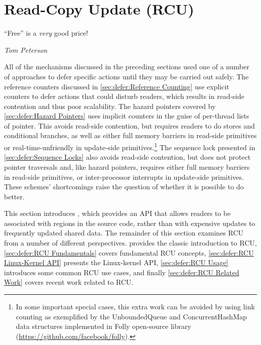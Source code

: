 
\section{Read-Copy Update (RCU)}
\label{sec:defer:Read-Copy Update (RCU)}
%
\epigraph{``Free'' is a \emph{very} good price!}{\emph{Tom Peterson}}

All of the mechanisms discussed in the preceding sections
used one of a number of approaches to defer specific actions
until they may be carried out safely.
The reference counters discussed in
\cref{sec:defer:Reference Counting}
use explicit counters to defer actions that could disturb readers,
which results in read-side contention and thus poor scalability.
The hazard pointers covered by
\cref{sec:defer:Hazard Pointers}
uses implicit counters in the guise of per-thread lists of pointer.
This avoids read-side contention, but requires readers to do stores and
conditional branches, as well as either full memory barriers in read-side
primitives or real-time-unfriendly  in
update-side primitives.\footnote{
	In some important special cases, this extra work can be avoided
	by using link counting as exemplified by the UnboundedQueue
	and ConcurrentHashMap data structures implemented in Folly
	open-source library
	(\url{https://github.com/facebook/folly}).}
The sequence lock presented in
\cref{sec:defer:Sequence Locks}
also avoids read-side contention, but does not protect pointer
traversals and, like hazard pointers, requires either full memory barriers
in read-side primitives, or inter-processor interrupts in update-side
primitives.
These schemes' shortcomings raise the question of
whether it is possible to do better.

This section introduces , which provides
an API that allows readers to be associated with regions in the source code,
rather than with expensive updates to frequently updated shared data.
The remainder of this
section examines RCU from a number of different perspectives.
 provides the classic
introduction to RCU,
\cref{sec:defer:RCU Fundamentals} covers fundamental RCU
concepts,
\cref{sec:defer:RCU Linux-Kernel API} presents the Linux-kernel
API,
\cref{sec:defer:RCU Usage} introduces some common RCU use cases,
and finally
\cref{sec:defer:RCU Related Work} covers recent work related
to RCU.






